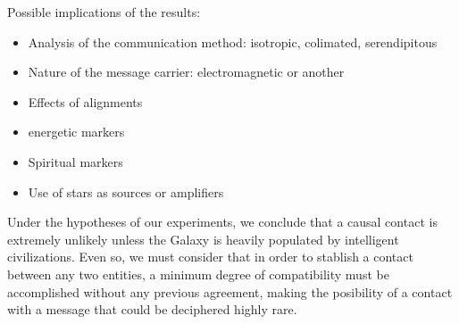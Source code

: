\documentclass[useAMS,usenatbib]{mnras}
\begin{document}
Possible implications of the results:

\begin{itemize}
   \item Analysis of the communication method: isotropic, colimated,
      serendipitous
   \item Nature of the message carrier: electromagnetic or another
   \item Effects of alignments
   \item energetic markers
   \item Spiritual markers
   \item Use of stars as sources or amplifiers
\end{itemize}


Under the hypotheses of our experiments, we conclude that
a causal contact is extremely unlikely unless the Galaxy is heavily
populated by intelligent civilizations.
%
Even so, we must consider that in order to stablish a contact between
any two entities, a minimum degree of compatibility must be
accomplished without any previous agreement, 
making the posibility of a contact with a message that
could be deciphered highly rare.
 



\end{document}
